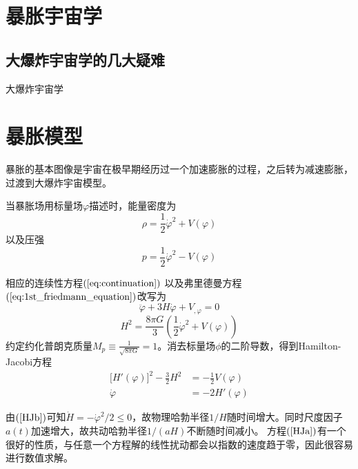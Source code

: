 \section{暴胀宇宙学}
\subsection{大爆炸宇宙学的几大疑难}
大爆炸宇宙学

\section{暴胀模型}
暴胀的基本图像是宇宙在极早期经历过一个加速膨胀的过程，之后转为减速膨胀，过渡到大爆炸宇宙模型。

当暴胀场用标量场$\varphi$描述时，能量密度为
\begin{equation}\label{eq:energy_density}
    \rho = \frac{1}{2}\dot{\varphi}^2+V(\varphi)
\end{equation}
以及压强
\begin{equation}\label{eq:pressure}
    p=\frac{1}{2}\dot{\varphi}^2-V(\varphi)
\end{equation}

相应的连续性方程$(\ref{eq:continuation})$
以及弗里德曼方程$(\ref{eq:1st_friedmann_equation})$改写为
\begin{equation}
    \ddot{\varphi}+3H\dot\varphi+V_{,\varphi}=0 
\end{equation}
\begin{equation}
    H^2=\frac{8\pi G}{3}\left(\frac{1}{2}\dot\varphi^2+V(\varphi)\right)
\end{equation}
约定约化普朗克质量$M_p\equiv\frac{1}{\sqrt{8\pi G}}=1$。消去标量场$\phi$的二阶导数，得到Hamilton-Jacobi方程
    \begin{align}
        \lbrack H'(\varphi)\rbrack^2 - \frac{3}{2}H^2 &=
        -\frac{1}{2}V(\varphi)\label{HJa} \\
        \dot\varphi  &= -2H'(\varphi)\label{HJb}
    \end{align}

    由$(\ref{HJb})$可知$\dot H=-\dot \varphi^2/2\leq 0$，故物理哈勃半径$1/H$随时间增大。同时尺度因子$a(t)$加速增大，故共动哈勃半径$1/(aH)$不断随时间减小。
    方程$(\ref{HJa})$有一个很好的性质，与任意一个方程解的线性扰动都会以指数的速度趋于零，因此很容易进行数值求解。
